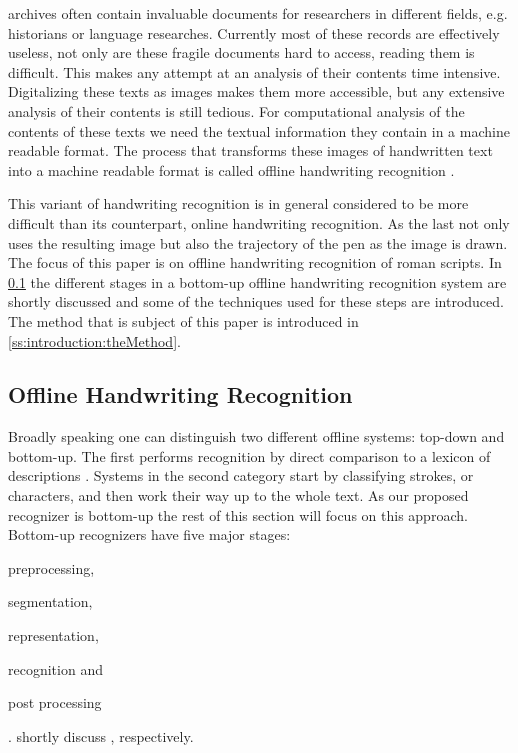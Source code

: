  archives often contain invaluable documents for researchers in different fields, e.g. historians or language researches. Currently most of these records are effectively useless, not only are these fragile documents hard to access, reading them is difficult. This makes any attempt at an analysis of their contents time intensive. Digitalizing these texts as images makes them more accessible, but any extensive analysis of their contents is still tedious. For computational analysis of the contents of these texts we need the textual information they contain in a machine readable format. The process that transforms these images of handwritten text into a machine readable format is called offline handwriting recognition \cite{graves2009offline}.

This variant of handwriting recognition is in general considered to be more difficult than its counterpart, online handwriting recognition. As the last not only uses the resulting image but also the trajectory of the pen as the image is drawn. The focus of this paper is on offline handwriting recognition of roman scripts. In \cref{ss:introduction:offlineHWR} the different stages in a bottom-up offline handwriting recognition system are shortly discussed and some of the techniques used for these steps are introduced. The method that is subject of this paper is introduced in \cref{ss:introduction:theMethod}.

\subsection{Offline Handwriting Recognition}
\label{ss:introduction:offlineHWR}
	Broadly speaking one can distinguish two different offline systems: top-down and bottom-up. The first performs recognition by direct comparison to a lexicon of descriptions \cite{impedovo2012fundamentals}. Systems in the second category start by classifying strokes, or characters, and then work their way up to the whole text. As our proposed recognizer is bottom-up the rest of this section will focus on this approach. Bottom-up recognizers have five major stages: 
	\begin{enumerate*}[label=(\roman*)]
		\item \label{it:introduction:preprocessing} preprocessing,
		\item \label{it:introduction:segmentation} segmentation,
		\item \label{it:introduction:representation} representation,
		\item \label{it:introduction:trainingRecognition} recognition and
		\item \label{it:introduction:postProcessing} post processing
	\end{enumerate*}
	\cite{arica2001overview}.  shortly discuss , respectively. 

